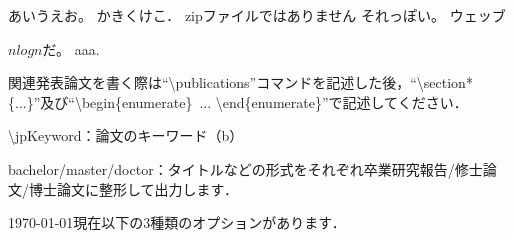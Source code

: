 
あいうえお。
かきくけこ．
zipファイルではありません
それっぽい。
ウェッブ

$n log n$だ。
aaa.\cite{bbb:123}

関連発表論文を書く際は``\textbackslash publications''コマンドを記述した後，``\textbackslash section*\{...\}''及び``\textbackslash begin\{enumerate\}\ ... \textbackslash end\{enumerate\}''で記述してください．

\item \textbackslash jpKeyword：論文のキーワード（b）

\item bachelor/master/doctor：タイトルなどの形式をそれぞれ卒業研究報告/修士論文/博士論文に整形して出力します．

\today 現在以下の3種類のオプションがあります．
